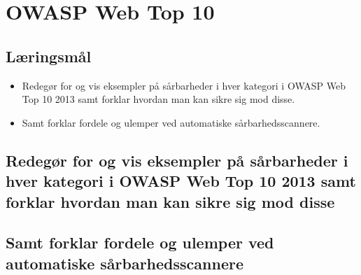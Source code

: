 \section{OWASP Web Top 10}

\subsection{Læringsmål}

\begin{itemize}
	\item Redegør for og vis eksempler på sårbarheder i hver kategori i OWASP Web Top 10
	2013 samt forklar hvordan man kan sikre sig mod disse.
	\item Samt forklar fordele og ulemper ved automatiske sårbarhedsscannere.
\end{itemize}

\subsection{Redegør for og vis eksempler på sårbarheder i hver kategori i OWASP Web Top 10 2013 samt forklar hvordan man kan sikre sig mod disse}
\subsection{Samt forklar fordele og ulemper ved automatiske sårbarhedsscannere}
